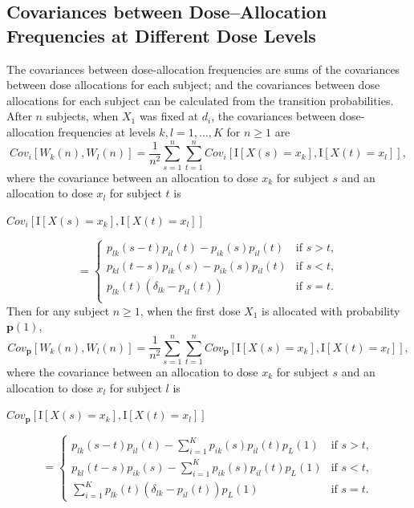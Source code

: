 \subsection{Covariances between Dose--Allocation Frequencies at Different Dose Levels}\label{sec:allocationcov}
The covariances between
dose-allocation frequencies are sums  of the covariances between
dose allocations for each subject; and the covariances between dose allocations for each subject can be calculated from
the transition probabilities. After $n$ subjects, when $X_1$ was
fixed at $d_i$, the covariances between dose-allocation frequencies at levels $k,l=1,\ldots,K$ for $n\ge 1$  are
\begin{equation*}
Cov_i\left[W_k(n),W_l(n)\right]
=\frac{1}{n^2}\sum_{s=1}^n\sum_{t=1}^nCov_i\left[\textrm{I}\left[X(s)=x_k\right],
\textrm{I}\left[X(t)=x_l\right]\right],
\end{equation*}
where the covariance between an allocation to dose $x_k$ for subject $s$ and an allocation to dose
$x_l$ for subject $t$ is
%
\begin{flushleft}
$Cov_i\left[\textrm{I}\left[X(s)=x_k\right],\textrm{I}\left[X(t)=x_l\right]\right]$\\
\end{flushleft}
\begin{equation*}
=
\begin{cases}
p_{lk}(s-t)p_{il}(t)-p_{ik}(s)p_{il}(t) &\textrm{if $s>t$},\\
p_{kl}(t-s)p_{ik}(s)-p_{ik}(s)p_{il}(t) &\textrm{if $s<t$},\\
p_{lk}(t)\left(\delta_{lk}-p_{il}(t)\right) &\textrm{if $s=t$}.\\
\end{cases}
\end{equation*}
Then for any subject $n\ge 1$, when the first dose $X_1$ is allocated with
probability $\mathbf{p}(1)$,
\begin{equation*}
Cov_{\mathbf{p}}\left[W_k(n),W_l(n)\right]
=\frac{1}{n^2}\sum_{s=1}^n\sum_{t=1}^nCov_{\mathbf{p}}
\left[\textrm{I}\left[X(s)=x_k\right],\textrm{I}\left[X(t)=x_l\right]\right],
\end{equation*}
where the covariance between an allocation to dose $x_k$ for subject $s$ and
an allocation to dose $x_l$ for subject $l$ is
\begin{flushleft}
$Cov_{\mathbf{p}}\left[\textrm{I}\left[X(s)=x_k\right],\textrm{I}\left[X(t)=x_l\right]\right]$
\end{flushleft}
\begin{equation*}
=
\begin{cases}
p_{lk}(s-t)p_{il}(t)-\displaystyle\sum_{i=1}^Kp_{ik}(s)p_{il}(t)p_L(1) &\textrm{if $s>t$},\\
p_{kl}(t-s)p_{ik}(s)-\displaystyle\sum_{i=1}^Kp_{ik}(s)p_{il}(t)p_L(1) &\textrm{if $s<t$},\\
\displaystyle\sum_{i=1}^Kp_{lk}(t)\left(\delta_{lk}-p_{il}(t)\right)p_L(1) &\textrm{if $s=t$}.
\end{cases}
\end{equation*}
